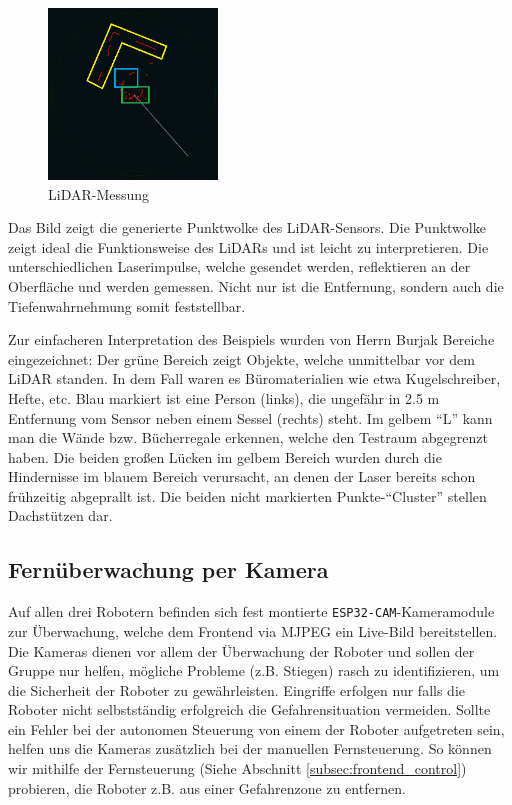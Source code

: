 \begin{figure}[H]
    \includegraphics[width=0.4\textwidth, center]{img/LiDARMessungZeichnung_alt.png}
    \caption{LiDAR-Messung}
    \label{fig:LiDAR-Messung}
\end{figure}

Das Bild zeigt die generierte Punktwolke des LiDAR-Sensors.
%
Die Punktwolke zeigt ideal die Funktionsweise des LiDARs
und ist leicht zu interpretieren.
%
Die unterschiedlichen Laserimpulse,
welche gesendet werden,
reflektieren an der Oberfläche und werden gemessen.
Nicht nur ist die Entfernung, sondern auch die Tiefenwahrnehmung somit feststellbar.

Zur einfacheren Interpretation des Beispiels
wurden von Herrn Burjak Bereiche eingezeichnet:
%
Der grüne Bereich zeigt Objekte,
welche unmittelbar vor dem LiDAR standen.
%
In dem Fall waren es Büromaterialien wie etwa Kugelschreiber, Hefte, etc.
%
Blau markiert ist eine Person (links),
die ungefähr in 2.5 m Entfernung vom Sensor
neben einem Sessel (rechts) steht.
%
Im gelbem ``L'' kann man die Wände bzw. Bücherregale erkennen,
welche den Testraum abgegrenzt haben.
Die beiden großen Lücken im gelbem Bereich wurden
durch die Hindernisse im blauem Bereich verursacht,
an denen der Laser bereits schon frühzeitig abgeprallt ist.
%
Die beiden nicht markierten Punkte-``Cluster'' stellen Dachstützen dar.


\subsection{Fernüberwachung per Kamera}
\label{subsec:frontend_cam_stream}
Auf allen drei Robotern befinden sich fest montierte
\texttt{ESP32-CAM}-Kameramodule zur Überwachung,
welche dem Frontend via MJPEG ein Live-Bild bereitstellen.
%
Die Kameras dienen vor allem der Überwachung der Roboter und sollen der Gruppe nur helfen,
mögliche Probleme (z.B. Stiegen) rasch zu identifizieren,
um die Sicherheit der Roboter zu gewährleisten.
%
Eingriffe erfolgen nur falls die Roboter nicht selbstständig erfolgreich die Gefahrensituation vermeiden.
%
Sollte ein Fehler bei der autonomen Steuerung von einem der Roboter aufgetreten sein,
helfen uns die Kameras zusätzlich bei der manuellen Fernsteuerung.
%
So können wir mithilfe der Fernsteuerung (Siehe Abschnitt \ref{subsec:frontend_control}) probieren,
die Roboter z.B. aus einer Gefahrenzone zu entfernen.

